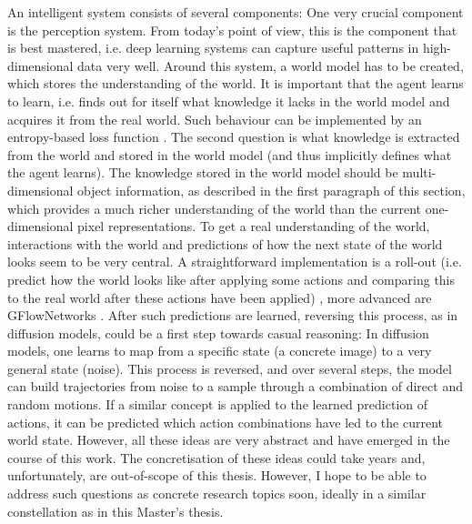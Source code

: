 An intelligent system consists of several components: One very crucial component is the perception system. From today's point of view, this is the component that is best mastered, i.e. deep learning systems can capture useful patterns in high-dimensional data very well. Around this system, a world model has to be created, which stores the understanding of the world. It is important that the agent learns to learn, i.e. finds out for itself what knowledge it lacks in the world model and acquires it from the real world. Such behaviour can be implemented by an entropy-based loss function . The second question is what knowledge is extracted from the world and stored in the world model (and thus implicitly defines what the agent learns). The knowledge stored in the world model should be multi-dimensional object information, as described in the first paragraph of this section, which provides a much richer understanding of the world than the current one-dimensional pixel representations. To get a real understanding of the world, interactions with the world and predictions of how the next state of the world looks seem to be very central. A straightforward implementation is a roll-out (i.e. predict how the world looks like after applying some actions and comparing this to the real world after these actions have been applied) , more advanced are GFlowNetworks . After such predictions are learned, reversing this process, as in diffusion models, could be a first step towards casual reasoning: In diffusion models, one learns to map from a specific state (a concrete image) to a very general state (noise). This process is reversed, and over several steps, the model can build trajectories from noise to a sample through a combination of direct and random motions. If a similar concept is applied to the learned prediction of actions, it can be predicted which action combinations have led to the current world state. However, all these ideas are very abstract and have emerged in the course of this work. The concretisation of these ideas could take years and, unfortunately, are out-of-scope of this thesis. However, I hope to be able to address such questions as concrete research topics soon, ideally in a similar constellation as in this Master's thesis.


